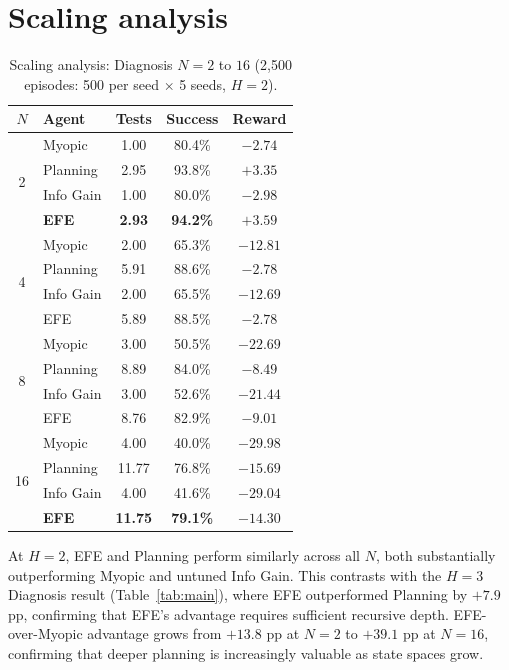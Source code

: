 \documentclass[runningheads]{llncs}
\begin{document}
\section{Scaling analysis}
\label{app:scaling}

\begin{table}[h]
\centering
\caption{Scaling analysis: Diagnosis $N = 2$ to $16$ (2{,}500 episodes: 500 per seed $\times$ 5 seeds, $H{=}2$).}
\begin{small}
\begin{tabular}{clccc}
\toprule
$N$ & Agent & Tests & Success & Reward \\
\midrule
\multirow{4}{*}{2}  & Myopic    & 1.00 & 80.4\% & $-2.74$ \\
                     & Planning  & 2.95 & 93.8\% & $+3.35$ \\
                     & Info Gain & 1.00 & 80.0\% & $-2.98$ \\
                     & \textbf{EFE} & \textbf{2.93} & \textbf{94.2\%} & $\mathbf{+3.59}$ \\
\midrule
\multirow{4}{*}{4}  & Myopic & 2.00 & 65.3\% & $-12.81$ \\
                     & Planning & 5.91 & 88.6\% & $-2.78$ \\
                     & Info Gain & 2.00 & 65.5\% & $-12.69$ \\
                     & EFE & 5.89 & 88.5\% & $-2.78$ \\
\midrule
\multirow{4}{*}{8}  & Myopic & 3.00 & 50.5\% & $-22.69$ \\
                     & Planning & 8.89 & 84.0\% & $-8.49$ \\
                     & Info Gain & 3.00 & 52.6\% & $-21.44$ \\
                     & EFE & 8.76 & 82.9\% & $-9.01$ \\
\midrule
\multirow{4}{*}{16} & Myopic & 4.00 & 40.0\% & $-29.98$ \\
                     & Planning & 11.77 & 76.8\% & $-15.69$ \\
                     & Info Gain & 4.00 & 41.6\% & $-29.04$ \\
                     & \textbf{EFE} & \textbf{11.75} & \textbf{79.1\%} & $\mathbf{-14.30}$ \\
\bottomrule
\end{tabular}
\end{small}
\end{table}

At $H{=}2$, EFE and Planning perform similarly across all $N$, both substantially outperforming Myopic and untuned Info Gain. This contrasts with the $H{=}3$ Diagnosis result (Table~\ref{tab:main}), where EFE outperformed Planning by $+7.9$ pp, confirming that EFE's advantage requires sufficient recursive depth. EFE-over-Myopic advantage grows from $+13.8$ pp at $N{=}2$ to $+39.1$ pp at $N{=}16$, confirming that deeper planning is increasingly valuable as state spaces grow.
\end{document}
